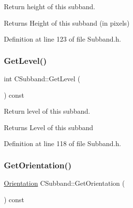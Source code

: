 Return height of this subband. \begin{DoxyReturn}{Returns}
Height of this subband (in pixels) 
\end{DoxyReturn}


Definition at line 123 of file Subband.\+h.


\begin{DoxyCode}{0}

\end{DoxyCode}
\mbox{\label{classCSubband_a4099f78d8e5541cb8b4d27fea63c8f1b}} 
\subsubsection{\texorpdfstring{GetLevel()}{GetLevel()}}
{\footnotesize\ttfamily int C\+Subband\+::\+Get\+Level (\begin{DoxyParamCaption}{ }\end{DoxyParamCaption}) const\hspace{0.3cm}{\ttfamily [inline]}}

Return level of this subband. \begin{DoxyReturn}{Returns}
Level of this subband 
\end{DoxyReturn}


Definition at line 118 of file Subband.\+h.


\begin{DoxyCode}{0}

\end{DoxyCode}
\mbox{\label{classCSubband_a5564725a3c96d5359a875a25d9f938b3}} 
\subsubsection{\texorpdfstring{GetOrientation()}{GetOrientation()}}
{\footnotesize\ttfamily \mbox{\hyperlink{PGFtypes_8h_a871118a09520247c78a71ecd7b0abd58}{Orientation}} C\+Subband\+::\+Get\+Orientation (\begin{DoxyParamCaption}{ }\end{DoxyParamCaption}) const\hspace{0.3cm}{\ttfamily [inline]}}

